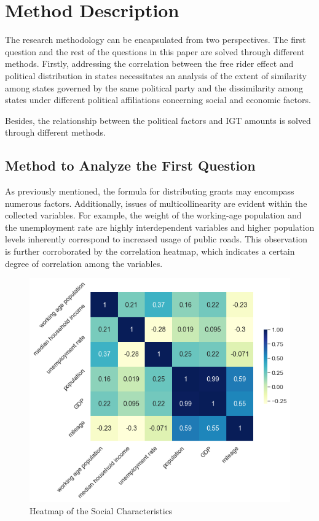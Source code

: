 \documentclass[man]{apa7}
\begin{document}
\section{Method Description}

The research methodology can be encapsulated from two perspectives. The first question and the rest of the questions in this paper are solved through different methods. Firstly, addressing the correlation between the free rider effect and political distribution in states necessitates an analysis of the extent of similarity among states governed by the same political party and the dissimilarity among states under different political affiliations concerning social and economic factors.

Besides, the relationship between the political factors and IGT amounts is solved through different methods.

\subsection{Method to Analyze the First Question}


As previously mentioned, the formula for distributing grants may encompass numerous factors. Additionally, issues of multicollinearity are evident within the collected variables. For example, the weight of the working-age population and the unemployment rate are highly interdependent variables and higher population levels inherently correspond to increased usage of public roads. This observation is further corroborated by the correlation heatmap, which indicates a certain degree of correlation among the variables.%

\begin{figure}
  \centering
  \includegraphics[scale=0.7]{Figures/heatmap.png}
  \caption[Heatmap of the Social Characteristics]{Heatmap of the Social Characteristics
    \texttt{} }
  \label{heatmap}
\end{figure}
\end{document}
